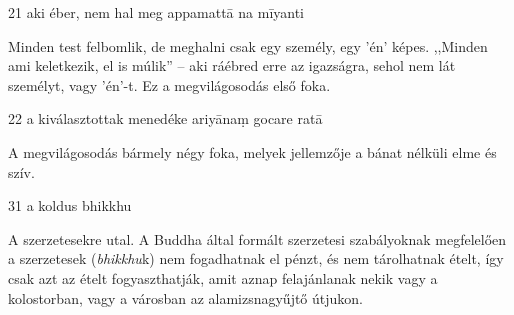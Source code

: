 
\begin{notesdescription}

\item[{21}
{aki éber, nem hal meg}
{appamattā na mīyanti}] \hfill\par

Minden test felbomlik, de meghalni csak egy személy, egy 'én' képes. ,,Minden ami keletkezik, el is múlik'' -- aki ráébred erre az igazságra, sehol nem lát személyt, vagy 'én'-t. Ez a megvilágosodás első foka.

\item[{22}
{a kiválasztottak menedéke}
{ariyānaṃ gocare ratā}] \hfill\par

A megvilágosodás bármely négy foka, melyek jellemzője a bánat nélküli elme és szív.

\item[{31}
{a koldus}
{bhikkhu}] \hfill\par

A szerzetesekre utal. A Buddha által formált szerzetesi szabályoknak megfelelően a szerzetesek (\textit{bhikkhu}k) nem fogadhatnak el pénzt, és nem tárolhatnak ételt, így csak azt az ételt fogyaszthatják, amit aznap felajánlanak nekik vagy a kolostorban, vagy a városban az alamizsnagyűjtő útjukon.

\end{notesdescription}
